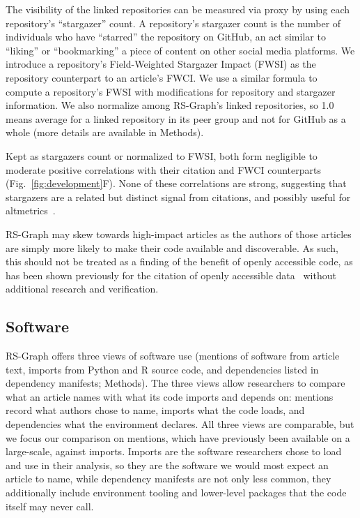 \documentclass[pdflatex,sn-nature]{sn-jnl}%
\begin{document}
The visibility of the linked repositories can be measured via proxy by using each repository's ``stargazer'' count. A repository's stargazer count is the number of individuals who have ``starred'' the repository on GitHub, an act similar to ``liking'' or ``bookmarking'' a piece of content on other social media platforms. We introduce a repository's Field-Weighted Stargazer Impact (FWSI) as the repository counterpart to an article's FWCI. We use a similar formula to compute a repository's FWSI with modifications for repository and stargazer information. We also normalize among RS-Graph's linked repositories, so 1.0 means average for a linked repository in its peer group and not for GitHub as a whole (more details are available in Methods).

Kept as stargazers count or normalized to FWSI, both form negligible to moderate positive correlations with their citation and FWCI counterparts (Fig.~\ref{fig:development}F). None of these correlations are strong, suggesting that stargazers are a related but distinct signal from citations, and possibly useful for altmetrics~\cite{priem2011altmetrics}.

RS-Graph may skew towards high-impact articles as the authors of those articles are simply more likely to make their code available and discoverable. As such, this should not be treated as a finding of the benefit of openly accessible code, as has been shown previously for the citation of openly accessible data~\cite{colavizza2020citation} without additional research and verification.

\subsection{Software}\label{subsec:software}

RS-Graph offers three views of software use (mentions of software from article text, imports from Python and R source code, and dependencies listed in dependency manifests; Methods). The three views allow researchers to compare what an article names with what its code imports and depends on: mentions record what authors chose to name, imports what the code loads, and dependencies what the environment declares. All three views are comparable, but we focus our comparison on mentions, which have previously been available on a large-scale, against imports. Imports are the software researchers chose to load and use in their analysis, so they are the software we would most expect an article to name, while dependency manifests are not only less common, they additionally include environment tooling and lower-level packages that the code itself may never call.
\end{document}
